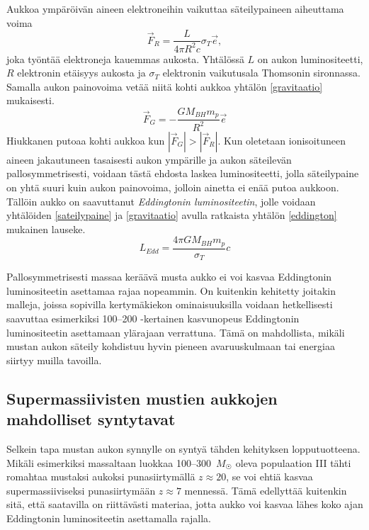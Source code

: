 \documentclass[12pt,a4paper]{article}
\begin{document}
Aukkoa ympäröivän aineen elektroneihin vaikuttaa säteilypaineen aiheuttama voima
\begin{equation}\label{sateilypaine}
	\vec{F}_R = \frac{L}{4 \pi R^2 c} \sigma_T \vec{e},
\end{equation}
joka työntää elektroneja kauemmas aukosta. Yhtälössä $L$ on aukon luminositeetti, $R$ elektronin etäisyys aukosta ja $\sigma_T$ elektronin vaikutusala Thomsonin sironnassa. Samalla aukon painovoima vetää niitä kohti aukkoa yhtälön \ref{gravitaatio} mukaisesti.
\begin{equation}\label{gravitaatio}
	\vec{F}_G = -\frac{GM_{BH}m_p}{R^2}\vec{e}
\end{equation}
Hiukkanen putoaa kohti aukkoa kun $|\vec{F}_G|>|\vec{F}_R|$. Kun oletetaan ionisoituneen aineen jakautuneen tasaisesti aukon ympärille ja aukon säteilevän pallosymmetrisesti, voidaan tästä ehdosta laskea luminositeetti, jolla säteilypaine on yhtä suuri kuin aukon painovoima, jolloin ainetta ei enää putoa aukkoon. Tällöin aukko on saavuttanut \textit{Eddingtonin luminositeetin}, jolle voidaan yhtälöiden \ref{sateilypaine} ja \ref{gravitaatio} avulla ratkaista yhtälön \ref{eddington} mukainen lauseke. \cite{pringle}
\begin{equation}\label{eddington}
	L_{Edd}=\frac{4 \pi GM_{BH}m_{p}}{\sigma_T}c
\end{equation}

Pallosymmetrisesti massaa keräävä musta aukko ei voi kasvaa Eddingtonin luminositeetin asettamaa rajaa nopeammin. On kuitenkin kehitetty joitakin malleja, joissa sopivilla kertymäkiekon ominaisuuksilla voidaan hetkellisesti saavuttaa esimerkiksi 100--200 -kertainen kasvunopeus Eddingtonin luminositeetin asettamaan ylärajaan verrattuna. Tämä on mahdollista, mikäli mustan aukon säteily kohdistuu hyvin pieneen avaruuskulmaan tai energiaa siirtyy muilla tavoilla. \cite{sadowski}

\subsection[Mustien aukkojen synty]{Supermassiivisten mustien aukkojen mahdolliset syntytavat}
Selkein tapa mustan aukon synnylle on syntyä tähden kehityksen lopputuotteena. Mikäli esimerkiksi massaltaan luokkaa 100--300~$M_{\astrosun}$ oleva populaation III tähti romahtaa mustaksi aukoksi punasiirtymällä $z \approx 20$, se voi ehtiä kasvaa supermassiiviseksi punasiirtymään $z\approx 7$ mennessä. Tämä edellyttää kuitenkin sitä, että saatavilla on riittävästi materiaa, jotta aukko voi kasvaa lähes koko ajan Eddingtonin luminositeetin asettamalla rajalla. \cite{whalen, volker}
\end{document}
